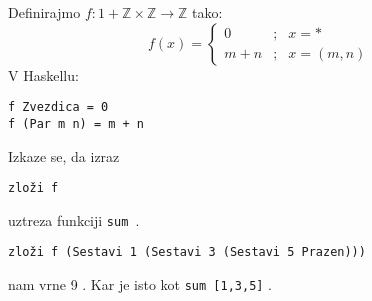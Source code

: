 \documentclass[t,usenames,dvipsnames]{beamer} %
\newcommand{\Z}{\mathbb Z}
\begin{document}
\begin{frame}
	
	Definirajmo $ f :  1+\Z \times \Z \to \Z $ tako:
	$$ f(x) = \left\{ \begin{array}{cll}
	0 & ; & x = * \\
	m+n & ; & x = (m,n)
	\end{array} \right. $$
	V Haskellu:
	\begin{beamerboxesrounded}[lower=loweryel,shadow=false]{}
		\texttt{f Zvezdica = 0 \\
			f (Par m n) = m + n} 
	\end{beamerboxesrounded}
	
	Izkaze se, da izraz	\\
	\begin{beamerboxesrounded}[lower=loweryel,shadow=false]{}
		\texttt{zloži f} 
	\end{beamerboxesrounded}
	uztreza funkciji \texttt{sum }.
	
	\begin{beamerboxesrounded}[lower=loweryel,shadow=false]{}
		\texttt{zloži f (Sestavi 1 (Sestavi 3 (Sestavi 5 Prazen))) } 
	\end{beamerboxesrounded}
	nam vrne 9 . Kar je isto kot 
	\texttt{sum [1,3,5]} .
	
	
\end{frame}


		
		
		
\end{document}
